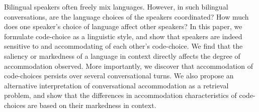 Bilingual speakers often freely mix languages. However, in such bilingual conversations, are the language choices of the speakers coordinated? How much does one speaker's choice of language affect other speakers? In this paper, we formulate code-choice as a linguistic style, and show that speakers are indeed sensitive to and accommodating of each other's code-choice. We find that the saliency or markedness of a language in context directly affects the degree of accommodation observed. More importantly, we discover that accommodation of code-choices persists over several conversational turns. We also propose an alternative interpretation of conversational accommodation as a retrieval problem, and show that the differences in accommodation characteristics of code-choices are based on their markedness in context.
